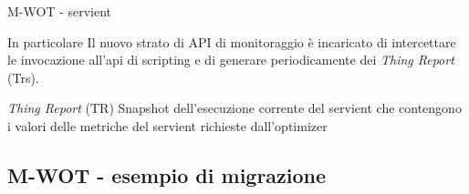 \documentclass{beamer}
\begin{document}
\begin{frame}{M-WOT - servient}
	\begin{block}{In particolare}
	Il nuovo strato di API di monitoraggio è incaricato di intercettare le invocazione all'api di scripting e di generare periodicamente dei \textit{Thing Report} (Trs).
	\end{block}
	\begin{block}{\textit{Thing Report} (TR)}
	Snapshot dell'esecuzione corrente del servient che contengono i valori delle metriche del servient richieste dall'optimizer
	\end{block}
	
\end{frame}


\subsection{M-WOT - esempio di migrazione}
\end{document}
